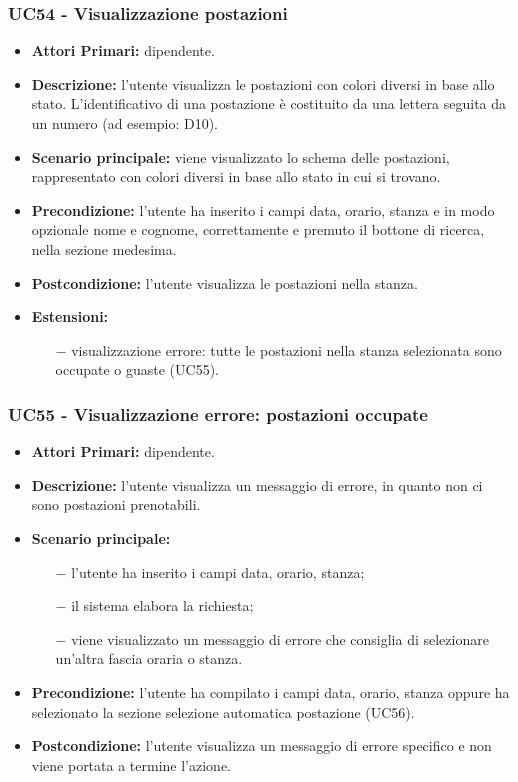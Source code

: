 \subsubsection{ UC54 - Visualizzazione postazioni  }
\begin{itemize}
	\item\textbf{Attori Primari:} dipendente.
	\item\textbf{Descrizione:} l’utente visualizza le postazioni con colori diversi in base allo stato. L'identificativo di una postazione è costituito da una lettera seguita da un numero (ad esempio: D10). 
	\item\textbf{Scenario principale:} viene visualizzato lo schema delle postazioni, rappresentato con colori diversi in base allo stato in cui si trovano.
	\item\textbf{Precondizione:} l’utente ha inserito i campi data, orario, stanza e in modo opzionale nome e cognome, correttamente e premuto il bottone di ricerca, nella sezione 
	medesima.
	\item\textbf{Postcondizione:} l’utente visualizza le postazioni nella stanza.
	\item\textbf{Estensioni:}
	\begin{itemize}
		\item[$-$] visualizzazione errore: tutte le postazioni nella stanza selezionata sono occupate o guaste (UC55).
	\end{itemize}
\end{itemize}
\subsubsection{ UC55 - Visualizzazione errore: postazioni occupate }
\begin{itemize}
	\item\textbf{Attori Primari:} dipendente.
	\item\textbf{Descrizione:} l’utente visualizza un messaggio di errore, in quanto non ci sono postazioni prenotabili.
	\item\textbf{Scenario principale:} 
	\begin{itemize}
		\item[$-$] l’utente ha inserito i campi data, orario, stanza;
		\item[$-$] il sistema elabora la richiesta;
		\item[$-$] viene visualizzato un messaggio di errore che consiglia di selezionare un'altra fascia oraria o stanza.
	\end{itemize}
	\item\textbf{Precondizione:} l’utente ha compilato i campi data, orario, stanza oppure ha selezionato la sezione selezione automatica postazione (UC56).
	\item\textbf{Postcondizione:} l’utente visualizza un messaggio di errore specifico e non viene portata a termine l'azione.
\end{itemize}

